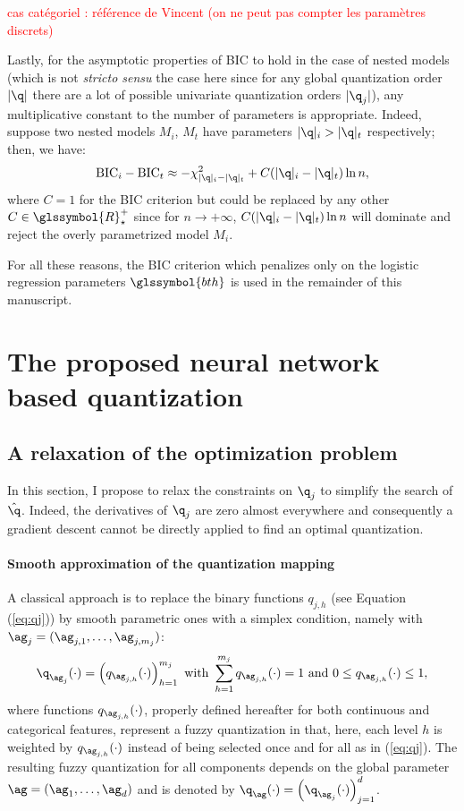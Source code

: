 \textcolor{red}{cas catégoriel : référence de Vincent (on ne peut pas compter les paramètres discrets)}

Lastly, for the asymptotic properties of BIC to hold in the case of nested models (which is not \textit{stricto sensu} the case here since for any global quantization order $|\q|$ there are a lot of possible univariate quantization orders $|\q_j|$), any multiplicative constant to the number of parameters is appropriate. Indeed, suppose two nested models $M_i$, $M_t$ have parameters $|\q|_i > |\q|_t$ respectively; then, we have:
\[ \text{BIC}_i - \text{BIC}_t \approx - \chi^2_{|\q|_i - |\q|_t} + C(|\q|_i - |\q|_t)\ln n, \]
where $C=1$ for the BIC criterion but could be replaced by any other $C \in \glssymbol{R}^+_\star$ since for $n \to + \infty$, $C(|\q|_i - |\q|_t)\ln n$ will dominate and reject the overly parametrized model $M_i$.

For all these reasons, the BIC criterion which penalizes only on the logistic regression parameters $\glssymbol{bth}$ is used in the remainder of this manuscript.

\section{The proposed neural network based quantization}
\label{sec:proposal}

\subsection{A relaxation of the optimization problem} \label{subsec:relaxation}

In this section, I propose to relax the constraints on $\q_j$ to simplify the search of $\hat{\q}$. Indeed, the derivatives of $\q_j$ are zero almost everywhere and consequently a gradient descent cannot be directly applied to find an optimal quantization.

\paragraph{Smooth approximation of the quantization mapping}

A classical approach is to replace the binary functions $q_{j,h}$ (see Equation (\ref{eq:qj}))  by smooth parametric ones  with a simplex condition, namely with $\ag_j=(\ag_{j,1},\ldots, \ag_{j,m_j})$:
\begin{equation*}
    {\q_{\ag_j}(\cdot)=\left(q_{\ag_{j,h}}(\cdot)\right)_{h=1}^{m_j} \text{ with } \sum_{h=1}^{m_j}q_{\ag_{j,h}}(\cdot)=1 \text{ and } 0 \leq q_{\ag_{j,h}}(\cdot) \leq 1,}
\end{equation*}
where functions $q_{\ag_{j,h}}(\cdot)$, properly defined hereafter for both continuous and categorical features, represent a fuzzy quantization in that, here, each level $h$ is weighted by $q_{\ag_{j,h}}(\cdot)$ instead of being selected once and for all as in (\ref{eq:qj}). The resulting fuzzy quantization for all components depends on the global parameter $\ag = (\ag_1, \ldots, \ag_d)$ and is denoted by $\q_{\ag}(\cdot)=\left(\q_{\ag_j}(\cdot)\right)_{j=1}^d$. 

